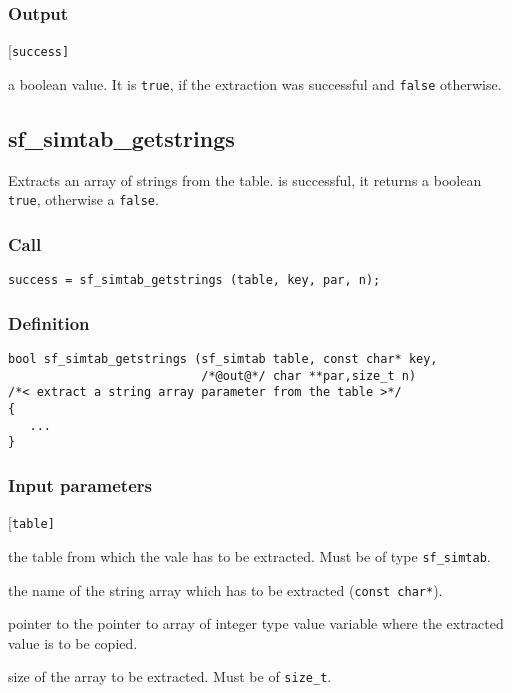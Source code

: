 \subsubsection*{Output}
\begin{desclist}{\tt }{\quad}[\tt success]
   \setlength\itemsep{0pt}
   \item[success] a boolean value. It is \texttt{true}, if the extraction was successful and \texttt{false} otherwise.
\end{desclist}




\subsection{{sf\_simtab\_getstrings}}\label{sec:sf_simtab_getstrings}
Extracts an array of strings from the table. is successful, it returns a boolean \texttt{true}, otherwise a \texttt{false}.

\subsubsection*{Call}
\begin{verbatim}success = sf_simtab_getstrings (table, key, par, n);\end{verbatim}

\subsubsection*{Definition}
\begin{verbatim}
bool sf_simtab_getstrings (sf_simtab table, const char* key,
                           /*@out@*/ char **par,size_t n)
/*< extract a string array parameter from the table >*/
{    
   ...
}
\end{verbatim}

\subsubsection*{Input parameters}
\begin{desclist}{\tt }{\quad}[\tt table]
   \setlength\itemsep{0pt}
   \item[table] the table from which the vale has to be extracted. Must be of type \texttt{sf\_simtab}.
   \item[key]   the name of the string array which has to be extracted (\texttt{const char*}).
   \item[par]   pointer to the pointer to array of integer type value variable where the extracted value is to be copied.
   \item[n]     size of the array to be extracted. Must be of \texttt{size\_t}.
\end{desclist}

